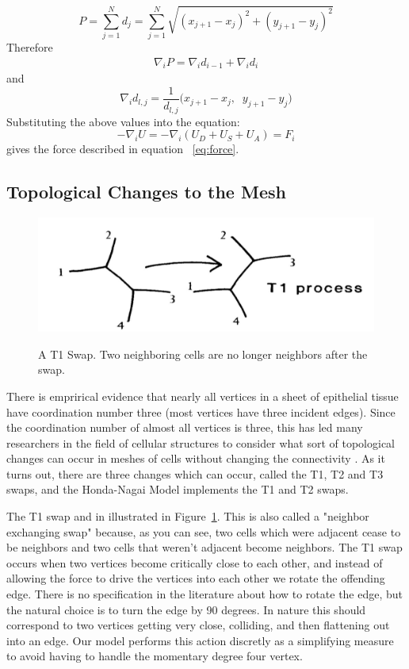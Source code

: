 \begin{equation}
P = \sum\limits_{j=1}^Nd_j = \sum\limits_{j=1}^N\sqrt{(x_{j+1} - x_j)^2 + (y_{j+1} - y_j)^2}
\end{equation}
Therefore
\begin{gather}
\nabla_iP = \nabla_id_{i-1} + \nabla_id_i
\end{gather}
and
\begin{equation}
\nabla_id_{l, j} = \frac1{d_{l, j}}
\Big(
x_{j+1}- x_j,\;\; y_{j+1} - y_j
\Big)
\end{equation}
Substituting the above values into the equation:
\begin{equation}
-\nabla_iU = -\nabla_i(U_D + U_S + U_A) = F_i
\end{equation}
gives the force described in equation ~\ref{eq:force}.

\subsection{Topological Changes to the Mesh}
\begin{figure}
    \centering
    \includegraphics[width=\textwidth, keepaspectratio]{../diagrams/t1.png}
    \label{fig:t1}
    \caption[A T1 Swap]{A T1 Swap. Two neighboring cells are no longer neighbors after the swap.}
\end{figure}
There is emprirical evidence that nearly all vertices in a sheet of epithelial tissue have coordination number three (most vertices have three incident edges)\cite{EpithelialTopology}. Since the coordination number of almost all vertices is three, this has led many researchers in the field of cellular structures to consider what sort of topological changes can occur in meshes of cells without changing the connectivity \cite{Soap}.  As it turns out, there are three changes which can occur, called the T1, T2 and T3 swaps, and the Honda-Nagai Model implements the T1 and T2 swaps.

 The T1 swap and in illustrated in Figure~\ref{fig:t1}. This is also called a "neighbor exchanging swap" because, as you can see, two cells which were adjacent cease to be neighbors and two cells that weren't adjacent become neighbors. The T1 swap occurs when two vertices become critically close to each other, and instead of allowing the force to drive the vertices into each other we rotate the offending edge. There is no specification in the literature about how to rotate the edge, but the natural choice is to turn the edge by 90 degrees. In nature this should correspond to two vertices getting very close, colliding, and then flattening out into an edge. Our model performs this action discretly as a simplifying measure to avoid having to handle the momentary degree four vertex.

